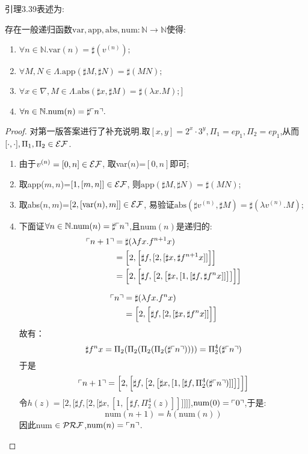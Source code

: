 
引理3.39表述为:

存在一般递归函数$\mathrm{var,app,abs,num}:\mathbb{N}\to\mathbb{N}$使得:
\begin{enumerate}[label=(\arabic*)]
    \item $\forall n\in\mathbb{N}. \mathrm{var}(n)=\sharp (v^{(n)});$\label{def:var}
    \item $\forall M, N\in \Lambda. \mathrm{app}(\sharp M,\sharp N)=\sharp (MN);$\label{def:app}
    \item $\forall x\in\nabla, M\in\Lambda. \mathrm{abs}(\sharp x, \sharp M) = \sharp(\lambda x. M);$]\label{def:abs}
    \item $\forall n\in\mathbb{N}. \text{num}(n)=\sharp\ulcorner{n}\urcorner.$
\end{enumerate}

\begin{proof}{\color {red} {对第一版答案进行了补充说明.}}取$[x,y]=2^x \cdot 3^y, \Pi_1=ep_1, \Pi_2=ep_1$,从而$[\cdot,\cdot],\Pi_1,\Pi_2 \in \mathcal{EF}$.

\begin{enumerate}[label=(\arabic*)]
    \item 由于$v^{(n)}=[0,n] \in \mathcal{EF}$, 取var($n$)=$[0,n]$即可;
    \item 取app($m,n$)=$[1,[m,n]] \in \mathcal{EF}$, 则$\text{app}(\sharp M,\sharp N)=\sharp (MN)$;
    \item 取abs($n,m$)=$[2,[\text{var}(n),m]] \in \mathcal{EF}$, 易验证$\text{abs}(\sharp v^{(n)}, \sharp M) = \sharp(\lambda v^{(n)}. M)$;
    \item 下面证$\forall n\in\mathbb{N}. \text{num}(n)=\sharp\ulcorner{n}\urcorner$,且num$(n)$是递归的:
        $$\begin{aligned}
          \ulcorner{n+1}\urcorner&=\sharp(\lambda fx. f^{n+1}x)\\
          &=\Big[2, \Big[\sharp f, [2, [\sharp x, \sharp f^{n+1}x]]\Big]\Big]\\
          &=\Big[2, \Big[\sharp f, \big[2, \big[\sharp x, [1,[\sharp f, \sharp f^n x]]\big]\big]\Big]\Big]
        \end{aligned}$$
        
        $$\begin{aligned}
          \ulcorner{n}\urcorner&=\sharp(\lambda fx. f^{n}x)\\
          &=\Big[2, \Big[\sharp f, [2, [\sharp x, \sharp f^{n}x]]\Big]\Big]\\
        \end{aligned}$$
        故有：
        $$\sharp f^{n}x = \Pi_2(\Pi_2(\Pi_2(\Pi_2(\sharp \ulcorner{n}\urcorner))))=\Pi_2^4(\sharp \ulcorner{n}\urcorner)$$
        于是
        $$\ulcorner{n+1}\urcorner = \Big[2, \Big[\sharp f, \big[2, \big[\sharp x, [1,[\sharp f, \Pi_2^4(\sharp \ulcorner{n}\urcorner)]]\big]\big]\Big]\Big]$$
        令$h(z) = \Big[2, \Big[\sharp f, \big[2, \big[\sharp x, [1,[\sharp f, \Pi_2^4(z)]]\big]\big]\Big]\Big]$,$\text{num}(0)=\ulcorner{0}\urcorner$,于是:
        $$\text{num}(n+1)=h(\text{num}(n))$$
        因此num $\in \mathcal{PRF}$,$\text{num}(n)=\ulcorner{n}\urcorner$.
    
\end{enumerate}

\end{proof}